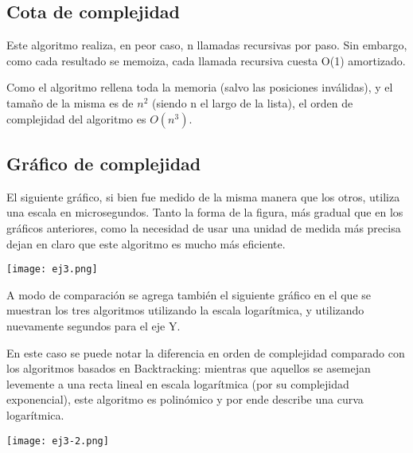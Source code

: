 	\subsection{Cota de complejidad}

	Este algoritmo realiza, en peor caso, n llamadas recursivas por paso. Sin embargo, como cada resultado se memoiza, cada llamada recursiva cuesta O(1) amortizado.

	Como el algoritmo rellena toda la memoria (salvo las posiciones inválidas), y el tamaño de la misma es de $n^2$ (siendo n el largo de la lista), el orden de complejidad del algoritmo es $O(n^3)$.

	\pagebreak
	\subsection{Gráfico de complejidad}

	El siguiente gráfico, si bien fue medido de la misma manera que los otros, utiliza una escala en microsegundos. Tanto la forma de la figura, más gradual que en los gráficos anteriores, como la necesidad de usar una unidad de medida más precisa dejan en claro que este algoritmo es mucho más eficiente.

	\begin{center}
	\texttt{[image: ej3.png]}
	\end{center}

	A modo de comparación se agrega también el siguiente gráfico en el que se muestran los tres algoritmos utilizando la escala logarítmica, y utilizando nuevamente segundos para el eje Y.

	En este caso se puede notar la diferencia en orden de complejidad comparado con los algoritmos basados en Backtracking: mientras que aquellos se asemejan levemente a una recta lineal en escala logarítmica (por su complejidad exponencial), este algoritmo es polinómico y por ende describe una curva logarítmica.

	\begin{center}
	\texttt{[image: ej3-2.png]}
	\end{center}